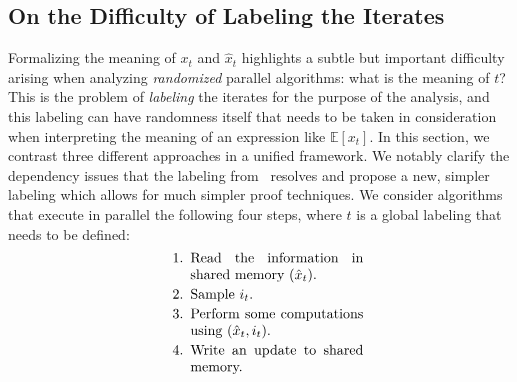 \documentclass[twoside]{article}
\newcommand{\E}{\mathbb{E}}
\begin{document}
\subsection{On the Difficulty of Labeling the Iterates} \label{ssec:labelingIssue}
\vspace{-2mm}
Formalizing the meaning of $x_t$ and $\hat x_t$ highlights a subtle but important difficulty arising when analyzing \emph{randomized} parallel algorithms: what is the meaning of $t$? 
This is the problem of \emph{labeling} the iterates for the purpose of the analysis, and this labeling can have randomness itself that needs to be taken in consideration when interpreting the meaning of an expression like $\E[x_t]$. 
In this section, we contrast three different approaches in a unified framework. 
We notably clarify the dependency issues that the labeling from~\citet{mania} resolves and propose a new, simpler labeling which allows for much simpler proof techniques.
We consider algorithms that execute in parallel the following four steps, where $t$ is a global labeling that needs to be defined:
\begin{equation} \label{eq:updates}
\begin{minipage}{0.43\textwidth}
\begin{enumerate}
\setlength\itemsep{-0.2em}
\item Read the information in shared memory ($\hat{x}_t$).
\item Sample $i_t$.
\item Perform some computations using ($\hat{x}_t, i_t$).
\item Write an update to shared memory.
\end{enumerate}
\end{minipage}
\end{equation}

\vspace{-4mm}
\end{document}
